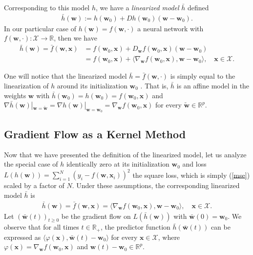 \documentclass{article}
\begin{document}
Corresponding to this model $h$, we have a \textit{linearized model} $\bar{h}$ defined
\begin{align}
    \bar{h}(\boldsymbol{w}) := h(\boldsymbol{w}_0) + Dh(\boldsymbol{w}_0)(\boldsymbol{w}-\boldsymbol{w}_0).\label{linearizedmodel}
\end{align}
In our particular case of $h(\boldsymbol{w}) = f(\boldsymbol{w}, \cdot)$ a neural network with $f(\boldsymbol{w}, \cdot): \mathcal{X} \rightarrow \mathbb{R}$, then we have
\begin{align}
    \bar{h}(\boldsymbol{w}) = \bar{f}(\boldsymbol{w}, \boldsymbol{x}) &=  f(\boldsymbol{w}_0, \boldsymbol{x}) + D_{\boldsymbol{w}}f(\boldsymbol{w}_0, \boldsymbol{x})(\boldsymbol{w}-\boldsymbol{w}_0) \nonumber\\ 
    &= f(\boldsymbol{w}_0, \boldsymbol{x}) + \langle \nabla_{\boldsymbol{w}} f(\boldsymbol{w}_0, \boldsymbol{x}), \boldsymbol{w}-\boldsymbol{w}_0\rangle, \quad \boldsymbol{x} \in \mathcal{X}.\label{linearizedmodelnetwork}
\end{align}

One will notice that the linearized model $\bar{h} = \bar{f}(\boldsymbol{w}, \cdot)$ is simply equal to the linearization of $h$ around its initialization $\boldsymbol{w}_0$ \cite{chizat2018lazy}. That is, $\bar{h}$ is an affine model in the weights $\boldsymbol{w}$ with $\bar{h}(\boldsymbol{w}_0) = h(\boldsymbol{w}_0) = f(\boldsymbol{w}_0, \boldsymbol{x})$ and $\nabla \bar{h}(\boldsymbol{w})|_{\boldsymbol{w} = \boldsymbol{\tilde{w}}} = \nabla h(\boldsymbol{w})|_{\boldsymbol{w} = \boldsymbol{w}_0} = \nabla_{\boldsymbol{w}} f(\boldsymbol{w}_0, \boldsymbol{x})$ for every $\boldsymbol{\tilde{w}} \in \mathbb{R}^p$. 

\subsection{Gradient Flow as a Kernel Method}\label{kernelmethod}

Now that we have presented the definition of the linearized model, let us analyze the special case of $h$ identically zero at its initialization $\boldsymbol{w}_0$ and loss $L(h(\boldsymbol{w})) = \sum_{i=1}^N (y_i - f(\boldsymbol{w}, \boldsymbol{x}_i))^2$ the square loss, which is simply (\ref{mse}) scaled by a factor of $N$. Under these assumptions, the corresponding linearized model $\bar{h}$ is
\begin{align*}
    \bar{h}(\boldsymbol{w}) = \bar{f}(\boldsymbol{w}, \boldsymbol{x}) = \langle \nabla_{\boldsymbol{w}} f(\boldsymbol{w}_0, \boldsymbol{x}), \boldsymbol{w}-\boldsymbol{w}_0\rangle, \quad \boldsymbol{x} \in \mathcal{X}. 
\end{align*}
Let $(\boldsymbol{\bar{w}}(t))_{t \geq 0}$ be the gradient flow on $L(\bar{h}(\boldsymbol{w}))$ with $\boldsymbol{\bar{w}}(0) = \boldsymbol{w}_0$. We observe that for all times $t\in \mathbb{R}_+$, the predictor function $\bar{h}(\boldsymbol{\bar{w}}(t))$ can be expressed as $\langle \varphi(\boldsymbol{x}), \boldsymbol{\bar{w}}(t) - \boldsymbol{w}_0 \rangle$ for every $\boldsymbol{x} \in \mathcal{X}$, where $\varphi(\boldsymbol{x}) = \nabla_{\boldsymbol{w}} f(\boldsymbol{w}_0, \boldsymbol{x})$ and $\boldsymbol{w}(t) - \boldsymbol{w}_0 \in \mathbb{R}^p$. 
\end{document}
